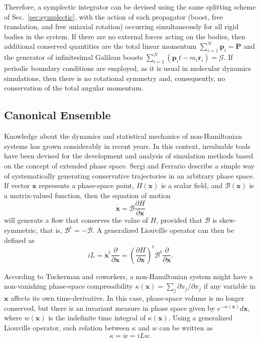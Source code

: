 \documentclass[aip,jcp,reprint,amsmath,amssymb]{revtex4-1}
\newcommand{\vt}[1]{\boldsymbol{\mathbf{#1}}}           %
\newcommand{\tr}[1]{#1^\text{t}}                        %
\newcommand{\diff}[2]{\dfrac{\partial #1}{\partial #2}} %
\begin{document}
Therefore, a symplectic integrator can be devised using the same splitting scheme of Sec.~\ref{sec:symplectic}, with the action of each propagator (boost, free translation, and free uniaxial rotation) occurring simultaneously for all rigid bodies in the system. If there are no external forces acting on the bodies, then additional conserved quantities are the total linear momentum $\sum_{i=1}^N \vt p_i = \vt P$ and the generator of infinitesimal Galilean boosts\cite{Ray1999, Schwichtenberg2015} $\sum_{i=1}^N(\vt p_i t - m_i \vt r_i) = \boldsymbol{\mathcal G}$. If periodic boundary conditions are employed, as it is usual in molecular dynamics simulations, then there is no rotational symmetry and, consequently, no conservation of the total angular momentum.

\subsection{Canonical Ensemble}
\label{sec:canonical}

Knowledge about the dynamics and statistical mechanics of non-Hamiltonian systems has grown considerably in recent years.\cite{Tuckerman_1999, Tuckerman2001, Sergi2001, Sergi2003, Ezra2004, Sergi2004, Ezra2006, Sergi2010b} In this context, invaluable tools have been devised for the development and analysis of simulation methods based on the concept of extended phase space. Sergi and Ferrario\cite{Sergi2001} describe a simple way of systematically generating conservative trajectories in an arbitrary phase space. If vector $\vt x$ represents a phase-space point, $H(\vt x)$ is a scalar field, and $\boldsymbol{\mathcal B}(\vt x)$ is a matrix-valued function, then the equation of motion
\begin{equation} \label{eq:eq_of_motion}
\dot{\vt x} = \boldsymbol{\mathcal B}\diff{H}{\vt x}
\end{equation}
will generate a flow that conserves the value of $H$, provided that $\boldsymbol{\mathcal B}$ is skew-symmetric, that is, $\tr{ \boldsymbol{ \mathcal B }} = -\boldsymbol{ \mathcal B }$. A generalized Liouville operator can then be defined as
\[
i\!L = \tr{\dot{\vt x}}\diff{}{\vt x} = \tr{\left(\diff{H}{\vt x}\right)} \tr{\boldsymbol{\mathcal B}} \diff{}{\vt x}.
\]

According to Tuckerman and coworkers,\cite{Tuckerman_1999, Tuckerman2001} a non-Hamiltonian system might have a non-vanishing phase-space compressibility $\kappa(\vt x) = \sum_j \partial \dot{x}_j/\partial x_j$ if any variable in $\vt x$ affects its own time-derivative. In this case, phase-space volume is no longer conserved, but there is an invariant measure in phase space given by $e^{-w(\vt x)}d\vt x$, where $w(\vt x)$ is the indefinite time integral of $\kappa(\vt x)$. Using a generalized Liouville operator, such relation between $\kappa$ and $w$ can be written as
\begin{equation}
\label{eq:relation_kappa_w}
\kappa = \dot w = i\!L w.
\end{equation}
\end{document}
